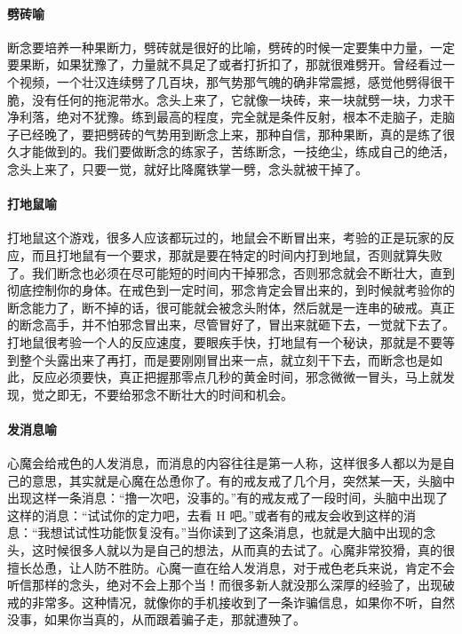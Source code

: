 \paragraph{劈砖喻}

断念要培养一种果断力，劈砖就是很好的比喻，劈砖的时候一定要集中力量，一定要果断，如果犹豫了，力量就不具足了或者打折扣了，那就很难劈开。曾经看过一个视频，一个壮汉连续劈了几百块，那气势那气魄的确非常震撼，感觉他劈得很干脆，没有任何的拖泥带水。念头上来了，它就像一块砖，来一块就劈一块，力求干净利落，绝对不犹豫。练到最高的程度，完全就是条件反射，根本不走脑子，走脑子已经晚了，要把劈砖的气势用到断念上来，那种自信，那种果断，真的是练了很久才能做到的。我们要做断念的练家子，苦练断念，一技绝尘，练成自己的绝活，念头上来了，只要一觉，就好比降魔铁掌一劈，念头就被干掉了。

\paragraph{打地鼠喻}

打地鼠这个游戏，很多人应该都玩过的，地鼠会不断冒出来，考验的正是玩家的反应，而且打地鼠有一个要求，那就是要在特定的时间内打到地鼠，否则就算失败了。我们断念也必须在尽可能短的时间内干掉邪念，否则邪念就会不断壮大，直到彻底控制你的身体。在戒色到一定时间，邪念肯定会冒出来的，到时候就考验你的断念能力了，断不掉的话，很可能就会被念头附体，然后就是一连串的破戒。真正的断念高手，并不怕邪念冒出来，尽管冒好了，冒出来就砸下去，一觉就下去了。打地鼠很考验一个人的反应速度，要眼疾手快，打地鼠有一个秘诀，那就是不要等到整个头露出来了再打，而是要刚刚冒出来一点，就立刻干下去，而断念也是如此，反应必须要快，真正把握那零点几秒的黄金时间，邪念微微一冒头，马上就发现，觉之即无，不要给邪念不断壮大的时间和机会。

\paragraph{发消息喻}

心魔会给戒色的人发消息，而消息的内容往往是第一人称，这样很多人都以为是自己的意思，其实就是心魔在怂恿你了。有的戒友戒了几个月，突然某一天，头脑中出现这样一条消息：“撸一次吧，没事的。”有的戒友戒了一段时间，头脑中出现了这样的消息：“试试你的定力吧，去看 H 吧。”或者有的戒友会收到这样的消息：“我想试试性功能恢复没有。”当你读到了这条消息，也就是大脑中出现的念头，这时候很多人就以为是自己的想法，从而真的去试了。心魔非常狡猾，真的很擅长怂恿，让人防不胜防。心魔一直在给人发消息，对于戒色老兵来说，肯定不会听信那样的念头，绝对不会上那个当！而很多新人就没那么深厚的经验了，出现破戒的非常多。这种情况，就像你的手机接收到了一条诈骗信息，如果你不听，自然没事，如果你当真的，从而跟着骗子走，那就遭殃了。

